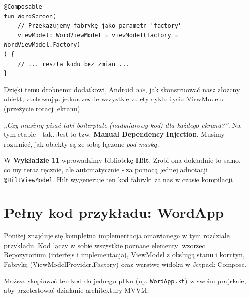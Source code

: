 \begin{verbatim}
@Composable
fun WordScreen(
    // Przekazujemy fabrykę jako parametr 'factory'
    viewModel: WordViewModel = viewModel(factory = WordViewModel.Factory)
) {
    // ... reszta kodu bez zmian ...
}
\end{verbatim}

Dzięki temu drobnemu dodatkowi, Android \textit{wie}, jak skonstruować nasz złożony obiekt, zachowując jednocześnie wszystkie zalety cyklu życia ViewModelu (przeżycie rotacji ekranu).

\textit{„Czy musimy pisać taki boilerplate (nadmiarowy kod) dla każdego ekranu?”}.
Na tym etapie - tak. Jest to tzw. \textbf{Manual Dependency Injection}. Musimy rozumieć, jak obiekty są ze sobą łączone \textit{pod maską}.

W \textbf{Wykładzie 11} wprowadzimy bibliotekę \textbf{Hilt}. Zrobi ona dokładnie to samo, co my teraz ręcznie, ale automatycznie - za pomocą jednej adnotacji \texttt{@HiltViewModel}. Hilt wygeneruje ten kod fabryki za nas w czasie kompilacji.

\section{Pełny kod przykładu: WordApp}

Poniżej znajduje się kompletna implementacja omawianego w tym rozdziale przykładu. Kod łączy w sobie wszystkie poznane elementy: wzorzec Repozytorium (interfejs i implementacja), ViewModel z obsługą stanu i korutyn, Fabrykę (ViewModelProvider.Factory) oraz warstwę widoku w Jetpack Compose.

Możesz skopiować ten kod do jednego pliku (np. \texttt{WordApp.kt}) w swoim projekcie, aby przetestować działanie architektury MVVM.

